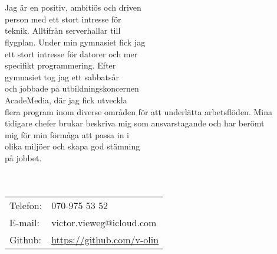 \documentclass[11pt,oneside,a4paper,titlepage]{article}
\begin{document}
\begin{tcolorbox}
    \begin{minipage}[t]{8cm}
        \vspace*{-18.2pt}
        \begin{tcolorbox}[grow to left by=15pt,colframe=sup-lgray,colback=sup-lgray,sharp corners]
            {\selectfont
                \\\\
                Jag är en positiv, ambitiös och driven\\
                person med ett stort intresse för\\
                teknik. Alltifrån serverhallar till\\
                flygplan. Under min gymnasiet fick jag\\
                ett stort intresse för datorer och mer\\
                specifikt programmering.
                Efter\\gymnasiet tog jag ett sabbatsår\\
                och jobbade på utbildningskoncernen\\
                AcadeMedia, där jag fick utveckla\\
                flera program inom diverse områden
                för att underlätta arbetsflöden. Mina\\
                tidigare chefer brukar beskriva
                mig som ansvarstagande och har berömt\\
                mig för min förmåga att passa in i\\
                olika miljöer och skapa god stämning\\
                på jobbet.\\\\
                \\
                \vspace*{15pt}
                \begin{tabular}{l l}
                    \\Telefon: & 070-975 53 52 \\
                    E-mail: & victor.vieweg@icloud.com \\
                    Github: & \href{https://github.com/v-olin}{https://github.com/v-olin} \\

\end{tabular}}
\end{tcolorbox}
\end{minipage}
\end{tcolorbox}
\end{document}
